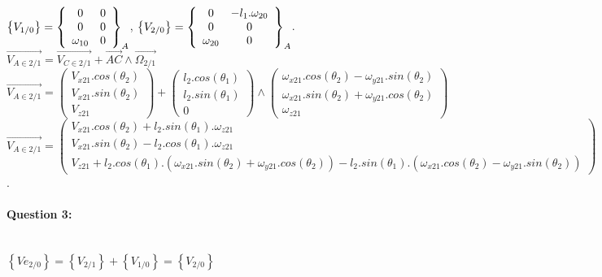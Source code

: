 $\left\{V_{1/0}\right\}=\left\{\begin{array}{c c}
0 & 0 \\ 0 & 0 \\ \omega_{10} & 0 
\end{array}\right\}_A$,
$\left\{V_{2/0}\right\}=\left\{\begin{array}{c c}
0 & -l_1.\omega_{20} \\ 0 & 0 \\ \omega_{20} & 0 
\end{array}\right\}_A$.\\
$\overrightarrow{V_{A\in 2/1}}=\overrightarrow{V_{C\in 2/1}}+\overrightarrow{AC}\wedge \overrightarrow{\Omega_{2/1}}$\\
$\overrightarrow{V_{A\in 2/1}}=\left(\begin{array}{c}
V_{x21}.cos(\theta_2) \\ V_{x21}.sin(\theta_2) \\ V_{z21}
\end{array}\right)+\left(\begin{array}{c}
l_2.cos(\theta_1) \\ l_2.sin(\theta_1) \\ 0
\end{array}\right)\wedge \left(\begin{array}{c}
\omega_{x21}.cos(\theta_2)-\omega_{y21}.sin(\theta_2) \\ \omega_{x21}.sin(\theta_2)+\omega_{y21}.cos(\theta_2) \\ \omega_{z21}
\end{array}\right)$ \\
$\overrightarrow{V_{A\in 2/1}}=\left(\begin{array}{c}
V_{x21}.cos(\theta_2)+l_2.sin(\theta_1).\omega_{z21} \\ V_{x21}.sin(\theta_2)-l_2.cos(\theta_1).\omega_{z21} \\ V_{z21}+l_2.cos(\theta_1).\left(\omega_{x21}.sin(\theta_2)+\omega_{y21}.cos(\theta_2)\right)-l_2.sin(\theta_1).\left(\omega_{x21}.cos(\theta_2)-\omega_{y21}.sin(\theta_2)\right)
\end{array}\right)$.

\paragraph{Question 3:} ~\ \\ 

$\left\{Ve_{2/0}\right\}=\left\{V_{2/1}\right\}+\left\{V_{1/0}\right\}=\left\{V_{2/0}\right\}$

